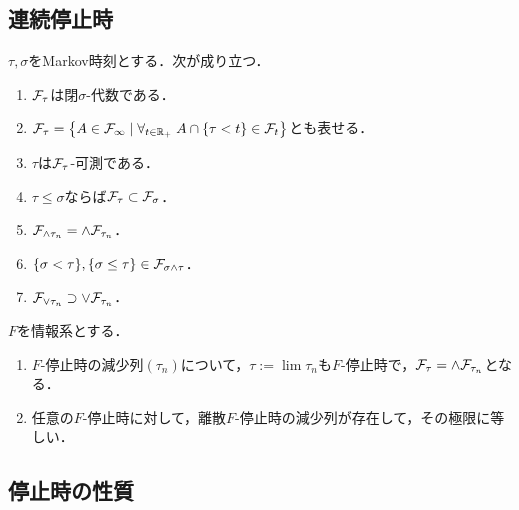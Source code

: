 \documentclass[uplatex,dvipdfmx]{jsreport}
\begin{document}
\subsection{連続停止時}

\begin{theorem}[連続停止時の性質]
    $\tau,\sigma$をMarkov時刻とする．次が成り立つ．
    \begin{enumerate}
        \item $\mathcal{F}_\tau$は閉$\sigma$-代数である．
        \item $\mathcal{F}_\tau=\left\{A\in\mathcal{F}_\infty\mid\forall_{t\in\mathbb{R}_+}\; A\cap\{\tau<t\}\in\mathcal{F}_t\right\}$とも表せる．
        \item $\tau$は$\mathcal{F}_\tau$-可測である．
        \item $\tau\le\sigma$ならば$\mathcal{F}_\tau\subset\mathcal{F}_\sigma$．
        \item $\mathcal{F}_{\land\tau_n}=\land\mathcal{F}_{\tau_n}$．
        \item $\{\sigma<\tau\},\{\sigma\le\tau\}\in\mathcal{F}_{\sigma\land\tau}$．
        \item $\mathcal{F}_{\lor\tau_n}\supset\lor\mathcal{F}_{\tau_n}$．
    \end{enumerate}
\end{theorem}

\begin{proposition}
    $F$を情報系とする．
    \begin{enumerate}
        \item $F$-停止時の減少列$(\tau_n)$について，$\tau:=\lim\tau_n$も$F$-停止時で，$\mathcal{F}_\tau=\land\mathcal{F}_{\tau_n}$となる．
        \item 任意の$F$-停止時に対して，離散$F$-停止時の減少列が存在して，その極限に等しい．
    \end{enumerate}
\end{proposition}

\subsection{停止時の性質}
\end{document}
